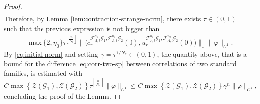 \documentclass{amsart}
\numberwithin{equation}{section}
\newcommand\vf{\varphi}
\renewcommand{\le}{\leqslant}
\newcommand\cC{{\mathcal C}}
\newcommand\cF{{\mathcal F}}
\newcommand\cG{{\mathcal G}}
\newcommand\cZ{{\mathcal Z}}
\newcommand{\catt}{\cF_{A,t}}
\begin{document}
\begin{proof}
\[\begin{split}
\end{split}
\]
Therefore, by Lemma \ref{lem:contraction-strange-norm}, there exists \(\tau \in (0,1)\) such that the previous expression is not bigger than
\[
\begin{split}
&\max\{2,\eta_0\}\tau^{\left\lfloor \frac{n}{N_c}\right\rfloor }\biggl\|\bigl(c_r^{\catt^{n_0} \cG_1, \catt^{n_0} \cG_2}\left(0\right), u_r^{\catt^{n_0} \cG_1, \catt^{n_0} \cG_2}\left ( 0\right)\bigr)\biggr\|_{\star} \|\vf\|_{\cC^1}.
\end{split}
\]
By \eqref{eq:initial-norm} and setting \(\gamma = \tau^{1/N_c} \in (0,1)\), the quantity above, that is a bound for the difference \eqref{eq:corr-two-sp} between correlations of two standard families, is estimated with
\[
      C\max\left\{\cZ(\cG_1), \cZ(\cG_2) \right\}\tau^{\left\lfloor\frac{n}{N_c}\right\rfloor}\|\vf\|_{\cC^1} \le  C \max\left\{\cZ(\cG_1), \cZ(\cG_2) \right\} \gamma^n \|\vf\|_{\cC^1},
\]
concluding the proof of the Lemma.
\end{proof}
\end{document}
